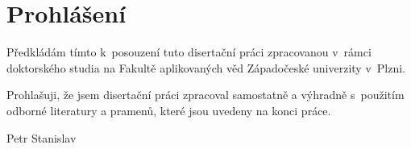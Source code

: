 \thispagestyle{empty}
\chapter*{Prohlášení}

\noindent Předkládám tímto  k~posouzení tuto disertační práci zpracovanou v~rámci doktorského studia na Fakultě aplikovaných věd Západočeské univerzity v~Plzni.

\vspace*{1cm}

\noindent Prohlašuji, že jsem disertační práci zpracoval samostatně a výhradně s~použitím odborné literatury a pramenů, které jsou uvedeny na konci práce.

\vspace*{2cm}


 \hspace*{8cm} {Petr Stanislav}
